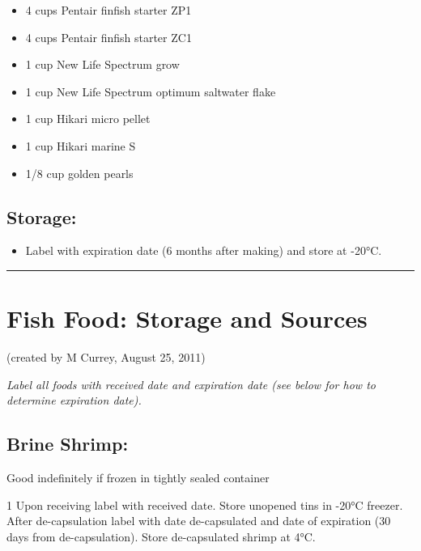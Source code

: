 \documentclass[
]{book}
\providecommand{\tightlist}{%
  \setlength{\itemsep}{0pt}\setlength{\parskip}{0pt}}
\begin{document}
\begin{itemize}
\tightlist
\item
  4 cups Pentair finfish starter ZP1
\item
  4 cups Pentair finfish starter ZC1
\item
  1 cup New Life Spectrum grow
\item
  1 cup New Life Spectrum optimum saltwater flake
\item
  1 cup Hikari micro pellet
\item
  1 cup Hikari marine S
\item
  1/8 cup golden pearls
\end{itemize}

\hypertarget{storage}{%
\subsection{Storage:}\label{storage}}

\begin{itemize}
\tightlist
\item
  Label with expiration date (6 months after making) and store at -20°C.
\end{itemize}

\begin{center}\rule{0.5\linewidth}{0.5pt}\end{center}

\hypertarget{fish-food-storage-and-sources}{%
\section{Fish Food: Storage and Sources}\label{fish-food-storage-and-sources}}

(created by M Currey, August 25, 2011)

\emph{Label all foods with received date and expiration date
(see below for how to determine expiration date).}

\hypertarget{brine-shrimp}{%
\subsection{Brine Shrimp:}\label{brine-shrimp}}

Good indefinitely if frozen in tightly sealed container

1 Upon receiving label with received date.
Store unopened tins in -20°C freezer.
After de-capsulation label with date de-capsulated and date of expiration (30 days from de-capsulation).
Store de-capsulated shrimp at 4°C.
\end{document}
